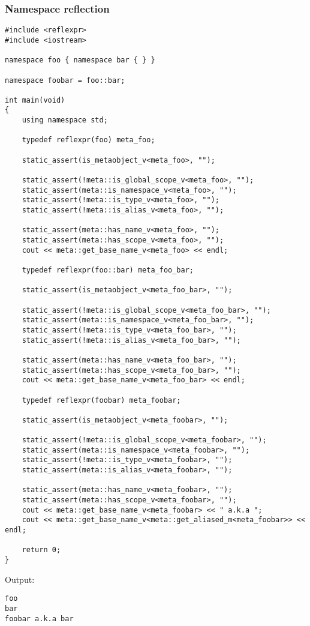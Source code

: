 \subsubsection{Namespace reflection}

\begin{verbatim}
#include <reflexpr>
#include <iostream>

namespace foo { namespace bar { } }

namespace foobar = foo::bar;

int main(void)
{
	using namespace std;

	typedef reflexpr(foo) meta_foo;

	static_assert(is_metaobject_v<meta_foo>, "");

	static_assert(!meta::is_global_scope_v<meta_foo>, "");
	static_assert(meta::is_namespace_v<meta_foo>, "");
	static_assert(!meta::is_type_v<meta_foo>, "");
	static_assert(!meta::is_alias_v<meta_foo>, "");

	static_assert(meta::has_name_v<meta_foo>, "");
	static_assert(meta::has_scope_v<meta_foo>, "");
	cout << meta::get_base_name_v<meta_foo> << endl;

	typedef reflexpr(foo::bar) meta_foo_bar;

	static_assert(is_metaobject_v<meta_foo_bar>, "");

	static_assert(!meta::is_global_scope_v<meta_foo_bar>, "");
	static_assert(meta::is_namespace_v<meta_foo_bar>, "");
	static_assert(!meta::is_type_v<meta_foo_bar>, "");
	static_assert(!meta::is_alias_v<meta_foo_bar>, "");

	static_assert(meta::has_name_v<meta_foo_bar>, "");
	static_assert(meta::has_scope_v<meta_foo_bar>, "");
	cout << meta::get_base_name_v<meta_foo_bar> << endl;

	typedef reflexpr(foobar) meta_foobar;

	static_assert(is_metaobject_v<meta_foobar>, "");

	static_assert(!meta::is_global_scope_v<meta_foobar>, "");
	static_assert(meta::is_namespace_v<meta_foobar>, "");
	static_assert(!meta::is_type_v<meta_foobar>, "");
	static_assert(meta::is_alias_v<meta_foobar>, "");

	static_assert(meta::has_name_v<meta_foobar>, "");
	static_assert(meta::has_scope_v<meta_foobar>, "");
	cout << meta::get_base_name_v<meta_foobar> << " a.k.a ";
	cout << meta::get_base_name_v<meta::get_aliased_m<meta_foobar>> << endl;

	return 0;
}
\end{verbatim}

Output:

\begin{verbatim}
foo
bar
foobar a.k.a bar
\end{verbatim}

